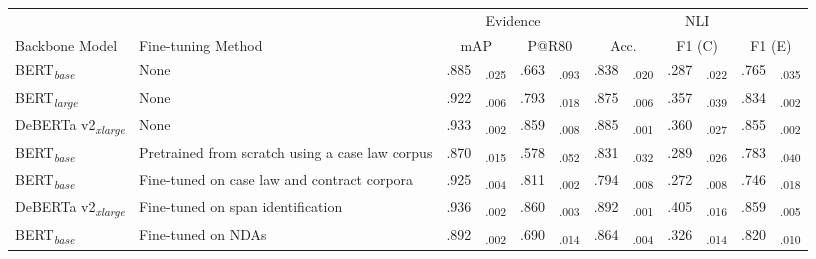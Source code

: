 \begin{table}[t]
    \centering
    \begin{threeparttable}
        \centering
        \fontsize{8pt}{10pt}\selectfont
        \setlength{\tabcolsep}{4pt}
        \renewcommand{\arraystretch}{.6}
        \begin{tabular}{llc@{\hskip0pt}cc@{\hskip0pt}cc@{\hskip0pt}cc@{\hskip0pt}cc@{\hskip0pt}c}\toprule
            &  & \multicolumn{4}{c}{Evidence} & \multicolumn{6}{c}{NLI} \\\cmidrule(lr){3-6}\cmidrule(lr){7-12}
            Backbone Model & Fine-tuning Method & \multicolumn{2}{c}{mAP} & \multicolumn{2}{c}{P@R80} & \multicolumn{2}{c}{Acc.} & \multicolumn{2}{c}{F1 (C)} & \multicolumn{2}{c}{F1 (E)} \\\midrule
            BERT\textsubscript{\textit{base}} & None & .885 & \textsubscript{.025} & .663 & \textsubscript{.093} & .838 & \textsubscript{.020} & .287 & \textsubscript{.022} & .765 & \textsubscript{.035} \\
            BERT\textsubscript{\textit{large}} & None & .922 & \textsubscript{.006} & .793 & \textsubscript{.018} & .875 & \textsubscript{.006} & .357 & \textsubscript{.039} & .834 & \textsubscript{.002} \\
            DeBERTa v2\textsubscript{\textit{xlarge}} & None & .933 & \textsubscript{.002} & .859 & \textsubscript{.008} & .885 & \textsubscript{.001} & .360 & \textsubscript{.027} & .855 & \textsubscript{.002} \\
            \midrule
            BERT\textsubscript{\textit{base}} & Pretrained from scratch using a case law corpus \cite{zheng_when_2021} & .870 & \textsubscript{.015} & .578 & \textsubscript{.052} & .831 & \textsubscript{.032} & .289 & \textsubscript{.026} & .783 & \textsubscript{.040} \\
            BERT\textsubscript{\textit{base}} & Fine-tuned on case law and contract corpora \cite{chalkidis_legal-bert_2020} & .925 & \textsubscript{.004} & .811 & \textsubscript{.002} & .794 & \textsubscript{.008} & .272 & \textsubscript{.008} & .746 & \textsubscript{.018} \\
            DeBERTa v2\textsubscript{\textit{xlarge}} & Fine-tuned on span identification \cite{hendrycks_cuad_2021} & .936 & \textsubscript{.002} & .860 & \textsubscript{.003} & .892 & \textsubscript{.001} & .405 & \textsubscript{.016} & .859 & \textsubscript{.005} \\
            \midrule
            BERT\textsubscript{\textit{base}} & Fine-tuned on NDAs & .892 & \textsubscript{.002} & .690 & \textsubscript{.014} & .864 & \textsubscript{.004} & .326 & \textsubscript{.014} & .820 & \textsubscript{.010} \\

\end{tabular}
\end{threeparttable}
\end{table}

